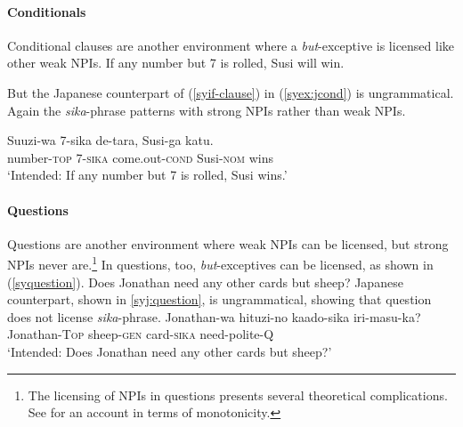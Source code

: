 \documentclass[output=paper,colorlinks,citecolor=brown,
]{langscibook}
\def\M#1{\textsc{#1}}
\begin{document}

   
\paragraph{Conditionals}
Conditional clauses are another environment where a \emph{but}-exceptive is licensed like other weak NPIs.
\ea \label{syif-clause}
If any number but 7 is rolled, Susi will win.\z

But the Japanese counterpart of (\ref{syif-clause}) in (\ref{syex:jcond}) is ungrammatical.  Again the \emph{sika}-phrase patterns with strong NPIs rather than weak NPIs.

\ea\label{syex:jcond}
   \gll *Suuzi-wa 7-sika de-tara, Susi-ga katu.\\
        number-\M{top} 7-\M{sika} come.out-\M{cond} Susi-\M{nom} wins\\
    \glt `Intended: If any number but 7 is rolled, Susi wins.'\z

\paragraph{Questions}
Questions are another environment where weak NPIs can be licensed, but strong NPIs never are.\footnote{The licensing of NPIs in questions presents several theoretical complications.  See \cite{nicolae15b} for an account in terms of monotonicity.} In questions, too, \emph{but}-exceptives can be licensed, as shown in (\ref{syquestion}).
\ea \label{syquestion}
Does Jonathan need any other cards but sheep?\z
Japanese counterpart, shown in \ref{syj:question}, is ungrammatical, showing that question does not license \emph{sika}-phrase.
\ea \label{syj:question}
\gll *Jonathan-wa hituzi-no kaado-sika iri-masu-ka?\\
Jonathan-\M{Top} sheep-\M{gen} card-\M{sika} need-polite-\M{Q}\\
\glt `Intended: Does Jonathan need any other cards but sheep?'\z



\end{document}
